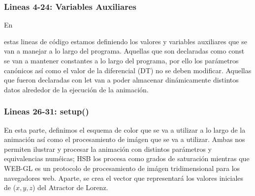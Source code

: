 \documentclass[stu, 12pt, letterpaper, donotrepeattitle, floatsintext]{apa7}
\begin{document}
    \subsubsection*{Lineas 4-24: Variables Auxiliares}
    En \begin{justifying}
      estas lineas de código estamos definiendo los valores y variables auxiliares que se van a manejar a lo largo del programa.
      Aquellas que son declaradas como {\selectfont const} se van a mantener constantes a lo largo del programa,
      por ello los parámetros canónicos así como el valor de la diferencial ({\selectfont DT}) no se deben modificar.
      Aquellas que fueron declaradas con {\selectfont let} van a poder almacenar dinámicamente distintos datos alrededor
      de la ejecución de la animación.\par
    \end{justifying}
    \vspace{\baselineskip}
    \subsubsection*{Lineas 26-31: {\selectfont setup()}}
    En esta parte, definimos el esquema de color que se va a utilizar a lo largo de la animación así como el procesamiento de imágen que se va a utilizar.
    Ambas nos permiten ilustrar y procesar la animación con distintos parámetros y equivalencias numéicas; HSB los procesa como grados de saturación mientras que
    WEB-GL es un protocolo de procesamiento de imágen tridimensional para los navegadores web. Aparte, se crea el vector que representará los valores iniciales
    de (\(x,y,z\)) del Atractor de Lorenz.\par
    \vspace{\baselineskip}
\end{document}
